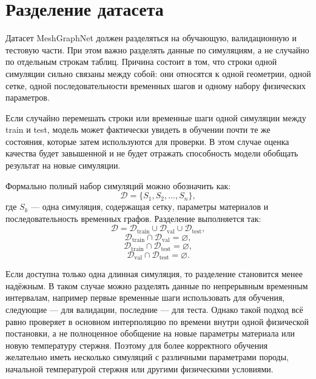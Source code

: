 \section{Разделение датасета}

Датасет MeshGraphNet должен разделяться на обучающую, валидационную и тестовую части. При этом важно разделять данные по симуляциям, а не случайно по отдельным строкам таблиц. Причина состоит в том, что строки одной симуляции сильно связаны между собой: они относятся к одной геометрии, одной сетке, одной последовательности временных шагов и одному набору физических параметров.

Если случайно перемешать строки или временные шаги одной симуляции между train и test, модель может фактически увидеть в обучении почти те же состояния, которые затем используются для проверки. В этом случае оценка качества будет завышенной и не будет отражать способность модели обобщать результат на новые симуляции.

Формально полный набор симуляций можно обозначить как:
\begin{equation}
    \mathcal{D}=\{S_1,S_2,\dots,S_n\},
\end{equation}
где $S_k$ --- одна симуляция, содержащая сетку, параметры материалов и последовательность временных графов. Разделение выполняется так:
\begin{equation}
    \mathcal{D}=\mathcal{D}_{\mathrm{train}}\cup\mathcal{D}_{\mathrm{val}}\cup\mathcal{D}_{\mathrm{test}},
\end{equation}
\begin{equation}
    \mathcal{D}_{\mathrm{train}}\cap\mathcal{D}_{\mathrm{val}}=\varnothing,
\end{equation}
\begin{equation}
    \mathcal{D}_{\mathrm{train}}\cap\mathcal{D}_{\mathrm{test}}=\varnothing,
\end{equation}
\begin{equation}
    \mathcal{D}_{\mathrm{val}}\cap\mathcal{D}_{\mathrm{test}}=\varnothing.
\end{equation}

Если доступна только одна длинная симуляция, то разделение становится менее надёжным. В таком случае можно разделять данные по непрерывным временным интервалам, например первые временные шаги использовать для обучения, следующие --- для валидации, последние --- для теста. Однако такой подход всё равно проверяет в основном интерполяцию по времени внутри одной физической постановки, а не полноценное обобщение на новые параметры материала или новую температуру стержня. Поэтому для более корректного обучения желательно иметь несколько симуляций с различными параметрами породы, начальной температурой стержня или другими физическими условиями.

